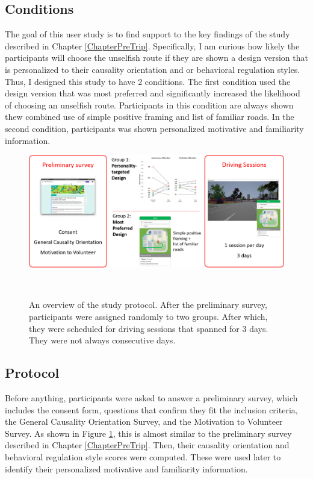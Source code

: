 \subsection{Conditions}
The goal of this user study is to find support to the key findings of the study described in Chapter \ref{ChapterPreTrip}. Specifically, I am curious how likely the participants will choose the unselfish route if they are shown a design version that is personalized to their causality orientation and or behavioral regulation styles. Thus, I designed this study to have 2 conditions. The first condition used the design version that was most preferred and significantly increased the likelihood of choosing an unselfish route. Participants in this condition are always shown thew combined use of simple positive framing and list of familiar roads. In the second condition, participants was shown personalized motivative and familiarity information. 

\begin{figure}[t]
\centering
  \includegraphics[scale=.45]{figures/s4-protocol.png}
  \caption{An overview of the study protocol. After the preliminary survey, participants were assigned randomly to two groups. After which, they were scheduled for driving sessions that spanned for 3 days. They were not always consecutive days.}~\label{fig:s4-protocol}
\end{figure}

\subsection{Protocol}
Before anything, participants were asked to answer a preliminary survey, which includes the consent form, questions that confirm they fit the inclusion criteria, the General Causality Orientation Survey, and the Motivation to Volunteer Survey. As shown in Figure \ref{fig:s4-protocol}, this is almost similar to the preliminary survey described in Chapter \ref{ChapterPreTrip}. Then, their causality orientation and behavioral regulation style scores were computed. These were used later to identify their personalized motivative and familiarity information. 

